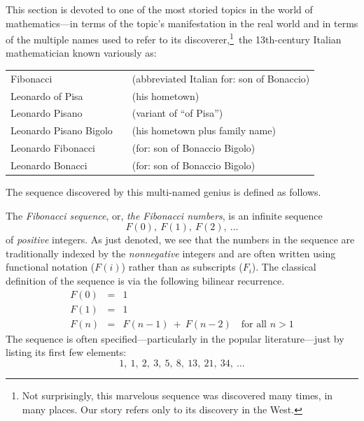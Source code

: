 This section is devoted to one of the most storied topics in the world of mathematics---in terms of the topic's manifestation in the real world and in terms of the multiple names used to refer to its discoverer,\footnote{Not surprisingly, this marvelous sequence was discovered many times, in many places.  Our story refers only to its discovery in the West.}~the 13th-century Italian mathematician known variously as:

\smallskip

\begin{tabular}{lcl}
Fibonacci                         &  &(abbreviated Italian for: son of Bonaccio) \\
Leonardo of Pisa             &  & (his hometown) \\
Leonardo Pisano             &  & (variant of ``of Pisa'') \\
Leonardo Pisano Bigolo  &  & (his hometown plus family name) \\
Leonardo Fibonacci        &  & (for: son of Bonaccio Bigolo) \\
Leonardo Bonacci           &   & (for: son of Bonaccio Bigolo) \\
\end{tabular}

\medskip

\noindent
The sequence discovered by this multi-named genius is defined as follows.

\medskip

The {\it Fibonacci sequence}, or, {\it the Fibonacci numbers}, is an infinite sequence
\[ F(0), \ F(1), \ F(2), \ \ldots \]
of {\em positive} integers.  As just denoted, we see that the numbers in the sequence are traditionally indexed by the {\em nonnegative} integers and are often written using functional notation ($F(i)$) rather than as subscripts ($F_i$).  The classical definition of the sequence is via the following bilinear recurrence.
\begin{eqnarray}
\nonumber
F(0) & = & 1 \\
\label{eq:Fibonacci-defn}
F(1) & = & 1 \\
\nonumber
F(n) & = & F(n-1) \ + \ F(n-2) \ \ \ \mbox{ for all } n > 1
\end{eqnarray}
The sequence is often specified---particularly in the popular literature---just by listing its first few elements:
\[ 1, \ 1, \ 2, \ 3, \ 5, \ 8, \ 13, \ 21, \ 34, \ \ldots \]



